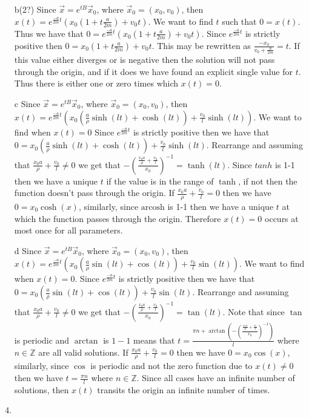 \documentclass[12pt, letterpaper]{article}
\newcommand{\Z}{\mathbb{Z}}
\begin{document}
\begin{enumerate}
\begin{enumerate}
		\item[b(2?)]
			Since $\Vec{x} = e^{tB}\Vec{x}_0$, where $\Vec{x}_0 = (x_0,v_0)$, then $x(t) = e^{\frac{-a}{2m}t}(x_0(1+t\frac{a}{2m}) + v_0 t)$.  We want to find $t$ such that $0 = x(t)$.  Thus we have that $0 = e^{\frac{-a}{2m}t}(x_0(1+t\frac{a}{2m}) + v_0 t)$.  Since $e^{\frac{-a}{2m}t}$ is strictly positive then $0 = x_0(1+t\frac{a}{2m}) + v_0 t$.  This may be rewritten as $ \frac{-x_0}{v_0 + \frac{a}{2m}} = t$.  If this value either diverges or is negative then the solution will not pass through the origin, and if it does we have found an explicit single value for $t$.  Thus there is either one or zero times which $x(t) = 0$.  
		\item[c] Since $\Vec{x} = e^{tB}\Vec{x}_0$, where $\Vec{x}_0 = (x_0,v_0)$, then $x(t) = e^{\frac{-a}{2m}t}(x_0 ( \frac{a}{\rho} \sinh(lt) + \cosh(lt)) + \frac{v_0}{l} \sinh(lt))$.  We want to find when $x(t) = 0$  Since $e^{\frac{-a}{2m}t}$ is strictly positive then we have that $ 0=x_0 ( \frac{a}{\rho} \sinh(lt) + \cosh(lt)) + \frac{v_0}{l} \sinh(lt)$.  Rearrange and assuming that $\frac{x_0 a}{\rho} + \frac{v_0}{l} \neq 0$ we get that $ -(\frac{\frac{x_0 a}{\rho} + \frac{v_0}{l}}{x_0})^{-1} = \tanh(lt)$.  Since $tanh$ is 1-1 then we have a unique $t$ if the value is in the range of $\tanh$, if not then the function doesn't pass through the origin.  If $\frac{x_0 a}{\rho} + \frac{v_0}{l} = 0$ then we have $0= x_0 \cosh(x)$, similarly, since $\text{arcosh}$ is 1-1 then we have a unique $t$ at which the function passes through the origin.  Therefore $x(t) = 0$ occurs at most once for all parameters.  
		\item[d] Since $\Vec{x} = e^{tB}\Vec{x}_0$, where $\Vec{x}_0 = (x_0,v_0)$, then $x(t) = e^{\frac{-a}{2m}t}(x_0 ( \frac{a}{\rho} \sin(lt) + \cos(lt)) + \frac{v_0}{l} \sin(lt))$. We want to find when $x(t) = 0$.  Since $e^{\frac{-a}{2m}t}$ is strictly positive then we have that $ 0=x_0 ( \frac{a}{\rho} \sin(lt) + \cos(lt)) + \frac{v_0}{l} \sin(lt)$.  Rearrange and assuming that $\frac{x_0 a}{\rho} + \frac{v_0}{l} \neq 0$ we get that $ -(\frac{\frac{x_0 a}{\rho} + \frac{v_0}{l}}{x_0})^{-1} = \tan(lt)$.  Note that since $\tan$ is periodic and $\arctan$ is $1-1$ means that $t = \frac{\pi n + \arctan(-(\frac{\frac{x_0 a}{\rho} + \frac{v_0}{l}}{x_0})^{-1})}{l}$ where $n \in \Z$ are all valid solutions.  If $\frac{x_0 a}{\rho} + \frac{v_0}{l} = 0$ then we have $0= x_0 \cos(x)$, similarly, since $\cos$ is periodic and not the zero function due to $x(t) \neq 0$ then we have $t=\frac{\pi n}{l}$ where $n \in \Z$.  Since all cases have an infinite number of solutions, then $x(t)$ transits the origin an infinite number of times.
		\item 
	\end{enumerate}
\end{enumerate}
\end{document}

